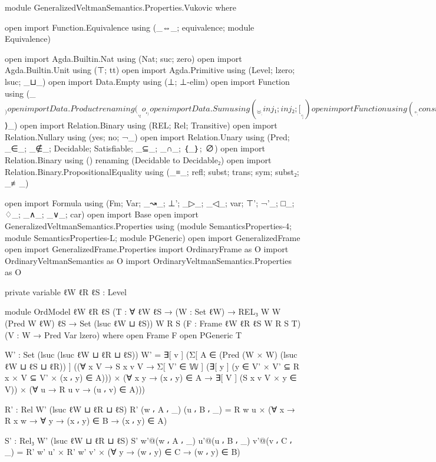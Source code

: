\begin{spverbatim}
module GeneralizedVeltmanSemantics.Properties.Vukovic where

open import Function.Equivalence using (_⇔_; equivalence; module Equivalence)

open import Agda.Builtin.Nat using (Nat; suc; zero)
open import Agda.Builtin.Unit using (⊤; tt)
open import Agda.Primitive using (Level; lzero; lsuc; _⊔_)
open import Data.Empty using (⊥; ⊥-elim)
open import Function using (_$_)
open import Data.Product renaming (_,_ to _⸴_)
open import Data.Sum using (_⊎_; inj₁; inj₂; [_,_])
open import Function using (_∘_; const; case_of_; id)
open import Function.Equality using (_⟨$⟩_)
open import Relation.Binary using (REL; Rel; Transitive)
open import Relation.Nullary using (yes; no; ¬_)
open import Relation.Unary using (Pred; _∈_; _∉_; Decidable; Satisfiable; _⊆_; _∩_; ｛_｝; ∅)
open import Relation.Binary using () renaming (Decidable to Decidable₂)
open import Relation.Binary.PropositionalEquality using (_≡_; refl; subst; trans; sym; subst₂; _≢_)

open import Formula using (Fm; Var; _↝_; ⊥'; _▷_; _◁_; var; ⊤'; ¬'_; □_; ♢_; _∧_; _∨_; car)
open import Base
open import GeneralizedVeltmanSemantics.Properties using (module SemanticsProperties-4; module SemanticsProperties-L; module PGeneric)
open import GeneralizedFrame
open import GeneralizedFrame.Properties
import OrdinaryFrame as O
import OrdinaryVeltmanSemantics as O
import OrdinaryVeltmanSemantics.Properties as O

private
  variable
    ℓW ℓR ℓS : Level

module OrdModel
  {ℓW ℓR ℓS}
  (T : ∀ {ℓW ℓS} → (W : Set ℓW) → REL₃ W W (Pred W ℓW) ℓS → Set (lsuc ℓW ⊔ ℓS))
  {W R S}
  (F : Frame {ℓW} {ℓR} {ℓS} W R S T)
  (V : W → Pred Var lzero)
  where
  open Frame F
  open PGeneric T

  W' : Set (lsuc (lsuc ℓW ⊔ ℓR ⊔ ℓS))
  W' =   ∃[ v ]
       (Σ[ A ∈ (Pred (W × W) (lsuc ℓW ⊔ ℓS ⊔ ℓR)) ]
       ((∀ {x V} → S x v V → Σ[ V' ∈ 𝕎 ]
         (∃[ y ] (y ∈ V' × V' ⊆ R x × V ⊆ V' × (x ⸴ y) ∈ A)))
       × (∀ {x y} → (x ⸴ y) ∈ A → ∃[ V ] (S x v V × y ∈ V))
       × (∀ {u} → R u v → (u ⸴ v) ∈ A)))

  R' : Rel W' (lsuc ℓW ⊔ ℓR ⊔ ℓS)
  R' (w ⸴ A ⸴ _) (u ⸴ B ⸴ _) = R w u × (∀ {x} → R x w → ∀ {y} → (x ⸴ y) ∈ B → (x ⸴ y) ∈ A)

  S' : Rel₃ W' (lsuc ℓW ⊔ ℓR ⊔ ℓS)
  S' w'@(w ⸴ A ⸴ _) u'@(u ⸴ B ⸴ _) v'@(v ⸴ C ⸴ _) =
    R' w' u' × R' w' v' × (∀ {y} → (w ⸴ y) ∈ C → (w ⸴ y) ∈ B)


\end{spverbatim}
